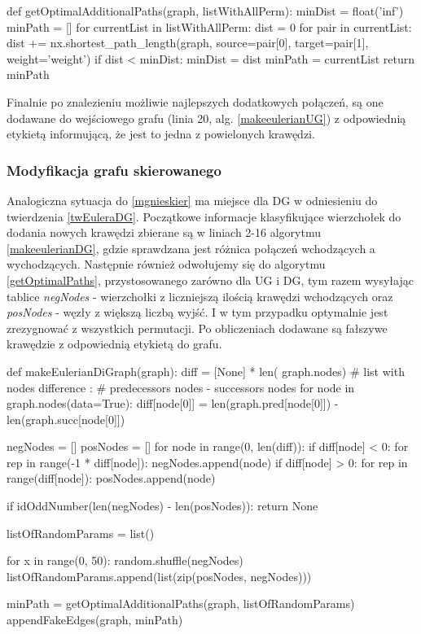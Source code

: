 \documentclass[a4paper, 12pt, twoside, openright]{article}
\begin{document}
\begin{algorithm}[caption={\textit{getOptimalAdditionalPaths} funkcja obliczająca i zwracająca najlepsze pary wierzchołków do połączenia, dla \textit{makeEulerianGraph} i \textit{makeEulerianDiGraph}}, label={getOptimalPaths}]
def getOptimalAdditionalPaths(graph, listWithAllPerm):
	minDist = float('inf')
	minPath = []
	for currentList in listWithAllPerm:
		dist = 0
		for pair in currentList:
			dist += nx.shortest_path_length(graph, source=pair[0], 
			target=pair[1], weight='weight')
		if dist < minDist:
			minDist = dist
			minPath = currentList
	return minPath
\end{algorithm}

	Finalnie po znalezieniu możliwie najlepszych dodatkowych połączeń, są one dodawane do wejściowego grafu (linia 20, alg. \ref{makeeulerianUG}) z odpowiednią etykietą informującą, że jest to jedna z powielonych krawędzi.


\subsubsection{Modyfikacja grafu skierowanego} \label{modSkier}
\indent\par
	Analogiczna sytuacja do \ref{mgnieskier} ma miejsce dla DG w odniesieniu do twierdzenia \ref{twEuleraDG}. Początkowe informacje klasyfikujące wierzchołek do dodania nowych krawędzi zbierane są w liniach 2-16 algorytmu \ref{makeeulerianDG}, gdzie sprawdzana jest różnica połączeń wchodzących a wychodzących. Następnie również odwołujemy się do algorytmu \ref{getOptimalPaths}, przystosowanego zarówno dla UG i DG, tym razem wysyłając tablice \textit{negNodes} - wierzchołki z liczniejszą ilością krawędzi wchodzących oraz \textit{posNodes} - węzły z większą liczbą wyjść. I w tym przypadku optymalnie jest zrezygnować z wszystkich permutacji. Po  obliczeniach dodawane są fałszywe krawędzie z odpowiednią etykietą do grafu.
	
\begin{algorithm}[caption={\textit{makeEulerianDiGraph} przekształcający graf skierowany do grafu Eulera}, label={makeeulerianDG}]
def makeEulerianDiGraph(graph):
	diff = [None] * len(
			graph.nodes)  # list with nodes difference : 
			    	      # predecessors nodes - successors nodes
	for node in graph.nodes(data=True):
		diff[node[0]] = len(graph.pred[node[0]]) - len(graph.succ[node[0]])
	
	negNodes = []
	posNodes = []
	for node in range(0, len(diff)):
		if diff[node] < 0:
			for rep in range(-1 * diff[node]):
				negNodes.append(node)
		if diff[node] > 0:
			for rep in range(diff[node]):
				posNodes.append(node)
	
	if idOddNumber(len(negNodes) - len(posNodes)):
		return None
	
	listOfRandomParams = list()
	
	for x in range(0, 50):
		random.shuffle(negNodes)
		listOfRandomParams.append(list(zip(posNodes, negNodes)))
	
	minPath = getOptimalAdditionalPaths(graph, listOfRandomParams)
	appendFakeEdges(graph, minPath)   
\end{algorithm}
\end{document}

